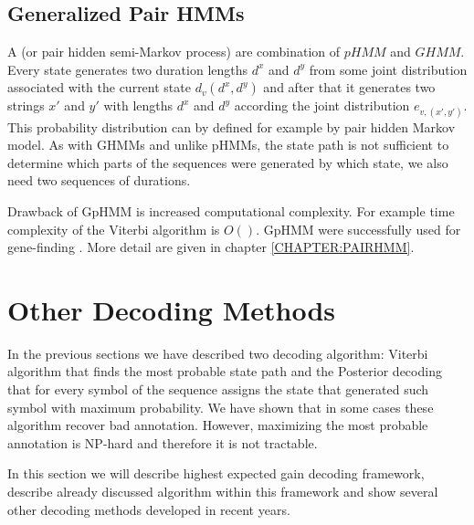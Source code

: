 \subsection{Generalized Pair HMMs}


A  (or pair hidden semi-Markov
process) are combination of $pHMM$ and $GHMM$. Every state generates two
duration lengths $d^x$ and $d^y$ from some joint distribution associated with
the current state $d_v(d^x,d^y)$ and after that it generates two strings $x'$
and $y'$ with lengths $d^x$ and $d^y$ according the joint distribution
$e_{v,(x',y')}$. This probability distribution can by defined for example by
pair hidden Markov model.  As with GHMMs and unlike pHMMs, the state path is not
sufficient to determine which parts of the sequences were generated by which
state, we also need two sequences of durations.

Drawback of GpHMM is increased computational complexity. For example time
complexity of the Viterbi algorithm is $O()$\cite{}.  GpHMM were successfully used for gene-finding
\cite{Meyer2002,SLAM2003,Alexanderson2004,Majoros2005}. More detail are given in
chapter \ref{CHAPTER:PAIRHMM}.





\section{Other Decoding Methods}
In the previous sections we have described two decoding algorithm: Viterbi algorithm
that finds the most probable state path  and the Posterior decoding that for
every symbol of the sequence assigns the state that generated such symbol with
maximum probability. 
We have shown that in some cases these algorithm recover bad
annotation. However, maximizing the most probable annotation is NP-hard and
therefore it is not tractable.

In this section we will describe highest expected gain decoding framework,
describe already discussed algorithm within this framework and show several
other decoding methods developed in recent years.

